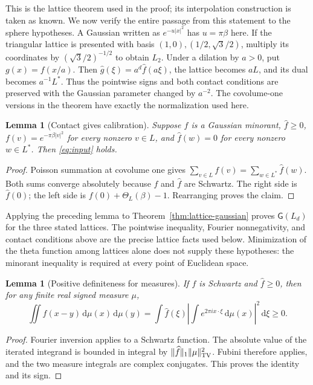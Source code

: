 \documentclass[11pt,a4paper]{article}
\newtheorem{lemma}[theorem]{Lemma}
\theoremstyle{definition}
\newcommand{\dd}{\,\mathrm d}
\newcommand{\norm}[1]{\lVert#1\rVert}
\newcommand{\abs}[1]{\lvert#1\rvert}
\newcommand{\G}{\mathsf G}
\numberwithin{equation}{section}
\begin{document}
This is the lattice theorem used in the proof; its interpolation construction is taken as known. We now verify the entire passage from this statement to the sphere hypotheses. A Gaussian written as $e^{-u\abs x^2}$ has $u=\pi\beta$ here. If the triangular lattice is presented with basis $(1,0),(1/2,\sqrt3/2)$, multiply its coordinates by $(\sqrt3/2)^{-1/2}$ to obtain $L_2$. Under a dilation by $a>0$, put $g(x)=f(x/a)$. Then $\widehat g(\xi)=a^d\widehat f(a\xi)$, the lattice becomes $aL$, and its dual becomes $a^{-1}L^*$. Thus the pointwise signs and both contact conditions are preserved with the Gaussian parameter changed by $a^{-2}$. The covolume-one versions in the theorem have exactly the normalization used here.

\begin{lemma}[Contact gives calibration]\label{lem:contact}
Suppose $f$ is a Gaussian minorant, $\widehat f\ge0$, $f(v)=e^{-\pi\beta\abs v^2}$ for every nonzero $v\in L$, and $\widehat f(w)=0$ for every nonzero $w\in L^*$. Then \eqref{eq:input} holds.
\end{lemma}
\begin{proof}
Poisson summation at covolume one gives $\sum_{v\in L}f(v)=\sum_{w\in L^*}\widehat f(w)$. Both sums converge absolutely because $f$ and $\widehat f$ are Schwartz. The right side is $\widehat f(0)$; the left side is $f(0)+\Theta_L(\beta)-1$. Rearranging proves the claim.
\end{proof}
Applying the preceding lemma to Theorem~\ref{thm:lattice-gaussian} proves $\G(L_d)$ for the three stated lattices. The pointwise inequality, Fourier nonnegativity, and contact conditions above are the precise lattice facts used below. Minimization of the theta function among lattices alone does not supply these hypotheses: the minorant inequality is required at every point of Euclidean space.

\begin{lemma}[Positive definiteness for measures]\label{lem:psd}
If $f$ is Schwartz and $\widehat f\ge0$, then for any finite real signed measure $\mu$,
\begin{equation}\label{eq:psd}
 \iint f(x-y)\dd\mu(x)\dd\mu(y)=
 \int\widehat f(\xi)\left|\int e^{2\pi i x\cdot\xi}\dd\mu(x)\right|^2\dd\xi\ge0.
\end{equation}
\end{lemma}
\begin{proof}
Fourier inversion applies to a Schwartz function. The absolute value of the iterated integrand is bounded in integral by $\norm{\widehat f}_1\norm\mu_{\rm TV}^2$. Fubini therefore applies, and the two measure integrals are complex conjugates. This proves the identity and its sign.
\end{proof}
\end{document}
